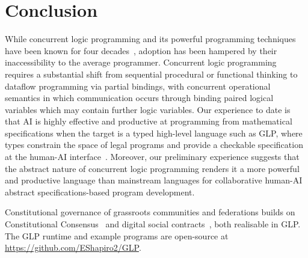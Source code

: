 \section{Conclusion}\label{section:conclusion}

While concurrent logic programming and its powerful programming techniques have been known for four decades~\cite{shapiro1989family}, adoption has been hampered by their inaccessibility to the average programmer. Concurrent logic programming requires a substantial shift from sequential procedural or functional thinking to dataflow programming via partial bindings, with concurrent operational semantics in which communication occurs through binding paired logical variables which may contain further logic variables.  Our experience to date is that AI is highly effective and productive at programming from mathematical specifications when the target is a typed high-level language such as GLP, where types constrain the space of legal programs and provide a checkable specification at the human-AI interface~\cite{shapiro2026types}. Moreover, our preliminary experience suggests that the abstract nature of concurrent logic programming renders it a more powerful and productive language than mainstream languages for collaborative human-AI abstract specifications-based program development.

Constitutional governance of grassroots communities and federations builds on Constitutional Consensus~\cite{keidar2025constitutional,lewis2025morpheus} and digital social contracts~\cite{cardelli2020digital,shapiro2022foundations}, both realisable in GLP.  The GLP runtime and example programs are open-source at \url{https://github.com/EShapiro2/GLP}.
